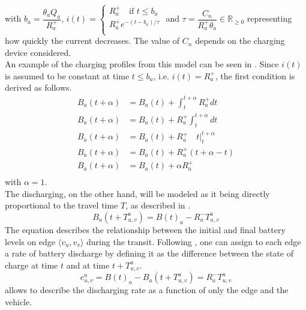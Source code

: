 with $b_a = \dfrac{\theta_a Q_a}{R^+_a}$,  $i(t)= \begin{cases} R^+_a \quad \text{if } t \leq  b_a\\
	R^+_a e^{-(t-b_a)/\tau}\\ \end{cases}$ and $\tau= \dfrac{C_n}{R^+_a\theta_a}\in \mathbb{R}_{\ge0}$  representing how quickly the current decreases. The value of $C_n$ depends on the charging device considered.   \\
	An example of the charging profiles from this model can be seen in . 
	 Since $i(t)$ is assumed to be constant at time $t\leq b_a$, i.e. $i(t) = R^+_a$, the first condition is derived as follows. 
\begin{align*}
	B_a(t+\alpha) &= B_a(t) + \int_{t}^{t+\alpha}R^+_adt\\
	B_a(t+\alpha) &= B_a(t) +R^+_a \int_{t}^{t+\alpha}dt\\
	B_a(t+\alpha) &= B_a(t) +R^+_a \quad t \bigg|_{t}^{t+\alpha}\\
	B_a(t+\alpha) &= B_a(t) +R^+_a (t+\alpha - t)\\
	B_a(t+\alpha) &= B_a(t) +\alpha R^+_a\\
\end{align*}
with $\alpha = 1$. \\
The discharging, on the other hand, will be modeled as it being directly proportional to the travel time $T$, as described in . 
\begin{equation}
	B_a(t+T_{u,v}^a) = B(t)_a - R^-_a T_{u,v}^a
	\label{eq:discharging}
\end{equation} 
The equation describes the relationship between the initial and final battery levels on edge $\langle v_u, v_v \rangle$ during the transit. Following , one can assign to each edge a rate of battery discharge by defining it as the difference between the state of charge at time $t$ and at time $t+T_{u,v}^a$. \\
\begin{equation}
	 e^a_{u,v} = B(t)_a - B_a(t+T_{u,v}^a) =  R^-_a T_{u,v}^a
	\label{eq:discharging_rate_per_edge}
\end{equation} 
 allows to describe the discharging rate as a function of only the edge and the vehicle. \\
